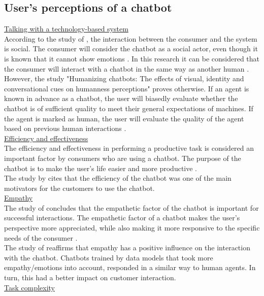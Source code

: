 \subsection{User’s perceptions of a chatbot}
\ul{Talking with a technology-based system}\\
According to the study of \citeauthor{Adam2021}, the interaction between the consumer and the system is social. The consumer will consider the chatbot as a social actor, even though it is known that it cannot show emotions \citep{Adam2021}. In this research it can be considered that the consumer will interact with a chatbot in the same way as another human \citep*{Cheng2021,Ischen2020}.\\
However, the study "Humanizing chatbots: The effects of visual, identity and conversational cues on humanness perceptions" proves otherwise. If an agent is known in advance as a chatbot, the user will biasedly evaluate whether the chatbot is of sufficient quality to meet their general expectations of machines. If the agent is marked as human, the user will evaluate the quality of the agent based on previous human interactions \citep*{Go2019,Shyam2008}.\\
\break
\ul{Efficiency and effectiveness}\\
The efficiency and effectiveness in performing a productive task is considered an important factor by consumers who are using a chatbot. The purpose of the chatbot is to make the user's life easier and more productive \citep{Brandtzaeg2018}.\\
The study by \citeauthor{Skjuve2019} cites that the efficiency of the chatbot was one of the main motivators for the customers to use the chatbot.\citep{Skjuve2019}\\
\break
\ul{Empathy}\\
The study of \citeauthor{Cheng2021} concludes that the empathetic factor of the chatbot is important for successful interactions. The empathetic factor of a chatbot makes the user's perspective more appreciated, while also making it more responsive to the specific needs of the consumer \citep{Cheng2021}.\\
The study of \citeauthor{Agarwal2021} reaffirms that empathy has a positive influence on the interaction with the chatbot. Chatbots trained by data models that took more empathy/emotions into account, responded in a similar way to human agents. In turn, this had a better impact on customer interaction. \citep{Agarwal2021}\\
\break
\ul{Task complexity}\\
